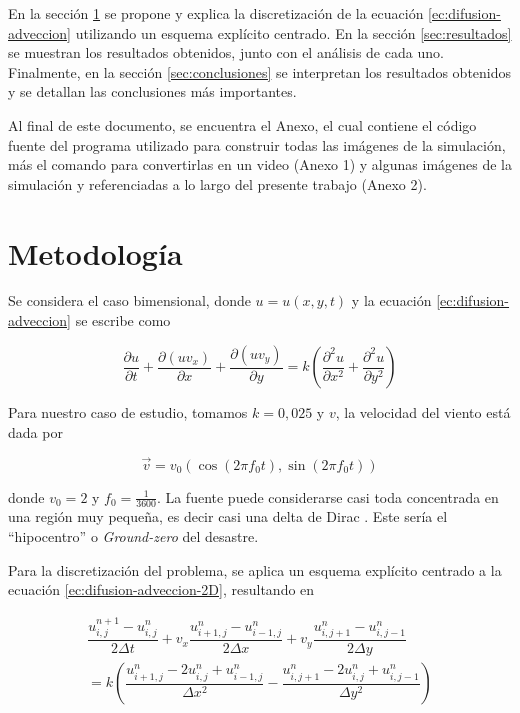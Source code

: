 \documentclass[twocolumn,a4paper,10pt]{article}
\begin{document}
En la secci\'on \ref{sec:metodologia} se propone y explica la discretizaci\'on de la ecuaci\'on \ref{ec:difusion-adveccion} utilizando un esquema expl\'icito centrado. En la secci\'on \ref{sec:resultados} se muestran los resultados obtenidos, junto con el an\'alisis de cada uno. Finalmente, en la secci\'on \ref{sec:conclusiones} se interpretan los resultados obtenidos y se detallan las conclusiones m\'as importantes.

Al final de este documento, se encuentra el Anexo, el cual contiene el c\'odigo fuente del programa utilizado para construir todas las im\'agenes de la simulaci\'on, 
m\'as el comando para convertirlas en un video (Anexo 1) y  algunas im\'agenes de la simulaci\'on y referenciadas a lo largo del presente trabajo (Anexo 2).

\section{Metodolog\'ia}
\label{sec:metodologia}
Se considera el caso bimensional, donde $u = u(x,y,t)$ y la ecuaci\'on \ref{ec:difusion-adveccion} se escribe como \cite{Guia2-MNA}

\begin{equation}
\label{ec:difusion-adveccion-2D}
\frac{\partial u}{\partial t} + \frac{\partial (uv_{x})}{\partial x} + \frac{\partial (uv_{y})}{\partial y}  = k \left(\frac{\partial^2 u}{\partial x^2} + \frac{\partial^2 u}{\partial y^2}\right)
\end{equation}

Para nuestro caso de estudio, tomamos $k = 0,025$ y $v$, la velocidad del viento est\'a dada por 

\begin{equation}
    \vec{v} = v_{0}(\cos (2\pi f_{0}t), \sin (2\pi f_{0}t))
\end{equation}

donde $v_{0} = 2$ y $f_{0} = \frac{1}{3600}$. La fuente puede considerarse casi toda concentrada en una regi\'on muy pequeña, es decir casi una 
delta de Dirac \cite{Guia2-MNA}. Este sería el ``hipocentro'' o \textit{Ground-zero} \cite{Ground-zero} del desastre.

Para la discretizaci\'on del problema, se aplica un esquema expl\'icito centrado a la ecuaci\'on \ref{ec:difusion-adveccion-2D}, resultando en 

\begin{equation}
\label{ec:discretizacion}
\begin{array}{c}
    \dfrac{u_{i,j}^{n+1} - u_{i,j}^{n}}{2\Delta t} + v_{x}\dfrac{u_{i+1,j}^{n} - u_{i-1,j}^{n}}{2\Delta x} + v_{y}\dfrac{u_{i,j+1}^{n} - u_{i,j-1}^{n}}{2\Delta y} \\ = k \left( \dfrac{u_{i+1,j}^{n} - 2u_{i,j}^{n} + u_{i-1,j}^{n}}{\Delta x^2} - \dfrac{u_{i,j+1}^{n} - 2u_{i,j}^{n} + u_{i,j-1}^{n}}{\Delta y^2}  \right)
\end{array}       
\end{equation}
\end{document}
